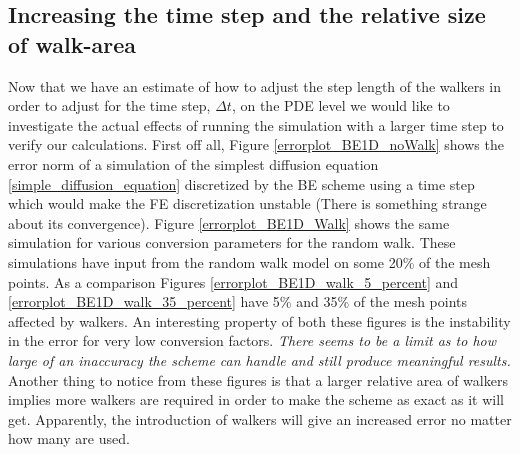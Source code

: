 

\subsection{Increasing the time step and the relative size of walk-area}\label{increasing_dt}

Now that we have an estimate of how to adjust the step length of the walkers in order to adjust for the time step, $\Delta t$, on the PDE level we would like to investigate the actual effects of running the simulation with a larger time step to verify our calculations. 
First off all, Figure \ref{errorplot_BE1D_noWalk} shows the error norm of a simulation of the simplest diffusion equation \eqref{simple_diffusion_equation} discretized by the BE scheme using a time step which would make the FE discretization unstable (There is something strange about its convergence). 
Figure \ref{errorplot_BE1D_Walk} shows the same simulation for various conversion parameters for the random walk. 
These simulations have input from the random walk model on some 20\% of the mesh points. 
As a comparison Figures \ref{errorplot_BE1D_walk_5_percent} and \ref{errorplot_BE1D_walk_35_percent} have 5\% and 35\% of the mesh points affected by walkers. 
An interesting property of both these figures is the instability in the error for very low conversion factors. 
\emph {There seems to be a limit as to how large of an inaccuracy the scheme can handle and still produce meaningful results. }
Another thing to notice from these figures is that a larger relative area of walkers implies more walkers are required in order to make the scheme as exact as it will get. 
Apparently, the introduction of walkers will give an increased error no matter how many are used.

